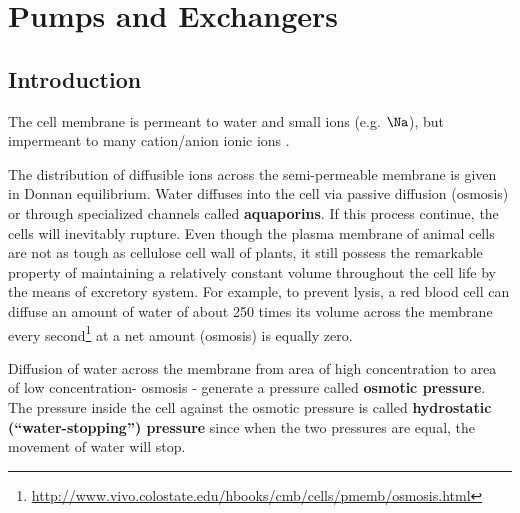 
\chapter{Pumps and Exchangers}
\label{chap:models-pumps}
\label{chap:exchangers}
\label{chap:pumps}


\section{Introduction}
\label{sec:introduction-15}

The cell membrane is permeant to water and small ions (e.g. $\Na$), but
impermeant to many cation/anion ionic ions \citep{overbeek1956}. 

The distribution of diffusible ions across the semi-permeable membrane is given
in Donnan equilibrium. Water diffuses into the cell via passive diffusion
(osmosis) or through specialized channels called {\bf aquaporins}. If this
process continue, the cells will inevitably rupture. Even though the plasma
membrane of animal cells are not as tough as cellulose cell wall of plants, it
still possess the remarkable property of maintaining a relatively constant
volume throughout the cell life by the means of excretory system. For example,
to prevent lysis, a red blood cell can diffuse an amount of water of about 250
times its volume across the membrane every
second\footnote{\url{http://www.vivo.colostate.edu/hbooks/cmb/cells/pmemb/osmosis.html}}
at a net amount (osmosis) is equally zero.

\begin{framed}

  Diffusion of water across the membrane from area of high concentration to area
  of low concentration- osmosis - generate a pressure called {\bf osmotic
  pressure}. The pressure inside the cell against the osmotic pressure is called
  {\bf hydrostatic (``water-stopping'') pressure} since when the two pressures
  are equal, the movement of water will stop.
\end{framed}

